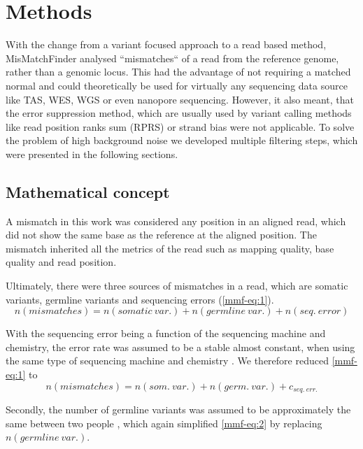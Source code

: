 \section{Methods}
\label{mmf-sec:methods}

With the change from a variant focused approach to a read based method, MisMatchFinder analysed ``mismatches`` of a read from the reference genome, rather than a genomic locus. This had the advantage of not requiring a matched normal and could theoretically be used for virtually any sequencing data source like TAS, WES, WGS or even nanopore sequencing. However, it also meant, that the error suppression method, which are usually used by variant calling methods like read position ranks sum (RPRS) or strand bias were not applicable. To solve the problem of high background noise we developed multiple filtering steps, which were presented in the following sections.

\subsection{Mathematical concept}
\label{mmf-sec:concept}
A mismatch in this work was considered  any position in an aligned read, which did not show the same base as the reference at the aligned position. The mismatch inherited all the metrics of the read such as mapping quality, base quality and read position. 

Ultimately, there were three sources of mismatches in a read, which are somatic variants, germline variants and sequencing errors (\autoref{mmf-eq:1}).
\begin{equation}
n(mismatches) = n(somatic~var.) + n(germline~var.)  + n(seq.~ error)
\label{mmf-eq:1}
\end{equation}
\myequation[\ref{mmf-eq:1}]{MisMatchFinder: number of mismatches}

With the sequencing error being a function of the sequencing machine and chemistry, the error rate was assumed to be a stable almost constant, when using the same type of sequencing machine and chemistry \cite{Schirmer2016,Stoler2021}. We therefore reduced \autoref{mmf-eq:1} to
\begin{equation}
n(mismatches) = n(som.~var.) + n(germ.~var.)  + c_{seq.~err.}
\label{mmf-eq:2}
\end{equation}
\myequation[\ref{mmf-eq:2}]{MisMatchFinder: sequencing error}

Secondly, the number of germline variants was assumed to be approximately the same between two people \cite{Auton2015}, which again simplified \autoref{mmf-eq:2} by replacing $n(germline~var.)$.

